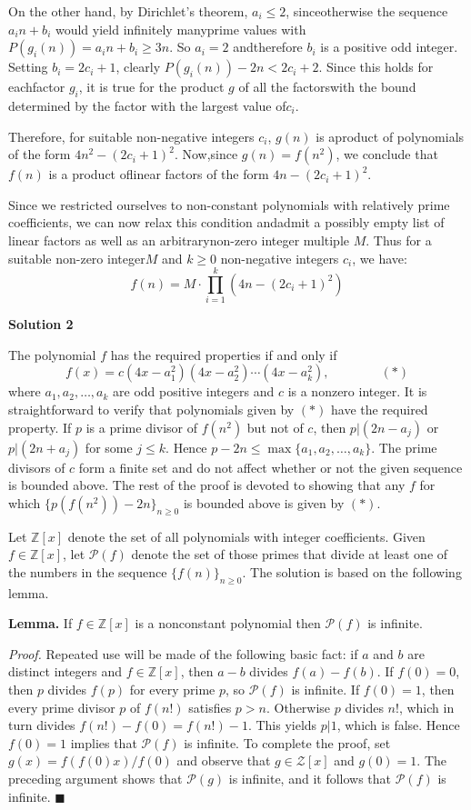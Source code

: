 \begin{enumerate}
 On the other hand, by Dirichlet's theorem, $a_i \le 2$, sinceotherwise the sequence $a_in + b_i$ would yield infinitely manyprime values with $P(g_i(n)) = a_in + b_i \ge 3n.$ So $a_i = 2$ andtherefore $b_i$ is a positive odd integer. Setting $b_i = 2c_i + 1$, clearly $P(g_i(n)) - 2n < 2c_i + 2$.  Since this holds for eachfactor $g_i$, it is true for the product $g$ of all the factorswith the bound determined by the factor with the largest value of$c_i$.

 Therefore, for suitable non-negative integers $c_i$, $g(n)$ is aproduct of polynomials of the form $4n^2 - (2c_i + 1)^2$.  Now,since $g(n) = f(n^2)$, we conclude that $f(n)$ is a product oflinear factors of the form $4n - (2c_i + 1)^2$.

 Since we restricted ourselves to non-constant polynomials with relatively prime coefficients, we can now relax this condition andadmit a possibly empty list of linear factors as well as an arbitrarynon-zero integer multiple $M$. Thus for a suitable non-zero integer$M$ and $k \ge 0$ non-negative integers $c_i$, we have: 
 \[f(n) = M \cdot \prod_{i=1}^k (4n - (2c_i + 1)^2)\]




\textbf{Solution 2}

The polynomial $f$ has the required properties if and only if
 \[f(x) = c(4x - a_1^2)(4x - a_2^2)\cdots (4x - a_k^2),\qquad\qquad (*)\]where $a_1, a_2, \ldots, a_k$ are odd positive integers and $c$ is a nonzero integer. It is straightforward to verify that polynomials given by $(*)$ have the required property. If $p$ is a prime divisor of $f(n^2)$ but not of $c$, then $p|(2n - a_j)$ or $p|(2n + a_j)$ for some $j\leq k$. Hence $p - 2n\leq \max\{a_1, a_2, \ldots, a_k\}$. The prime divisors of $c$ form a finite set and do not affect whether or not the given sequence is bounded above. The rest of the proof is devoted to showing that any $f$ for which $\{p(f(n^2)) - 2n\}_{n\geq 0}$ is bounded above is given by $(*)$.

 Let $\mathbb{Z}[x]$ denote the set of all polynomials with integer coefficients. Given $f\in\mathbb{Z}[x]$, let $\mathcal{P}(f)$ denote the set of those primes that divide at least one of the numbers in the sequence $\{f(n)\}_{n\geq 0}$. The solution is based on the following lemma.

 \textbf{Lemma.} If $f\in\mathbb{Z}[x]$ is a nonconstant polynomial then $\mathcal{P}(f)$ is infinite.

 \textit{Proof.} Repeated use will be made of the following basic fact: if $a$ and $b$ are distinct integers and $f\in\mathbb{Z}[x]$, then $a - b$ divides $f(a) - f(b)$. If $f(0) = 0$, then $p$ divides $f(p)$ for every prime $p$, so $\mathcal{P}(f)$ is infinite. If $f(0) = 1$, then every prime divisor $p$ of $f(n!)$ satisfies $p > n$. Otherwise $p$ divides $n!$, which in turn divides $f(n!) - f(0) = f(n!) - 1$. This yields $p|1$, which is false. Hence $f(0) = 1$ implies that $\mathcal{P}(f)$ is infinite. To complete the proof, set $g(x) = f(f(0)x)/f(0)$ and observe that $g\in\mathcal{Z}[x]$ and $g(0) = 1$. The preceding argument shows that $\mathcal{P}(g)$ is infinite, and it follows that $\mathcal{P}(f)$ is infinite. $\blacksquare$


\end{enumerate}
